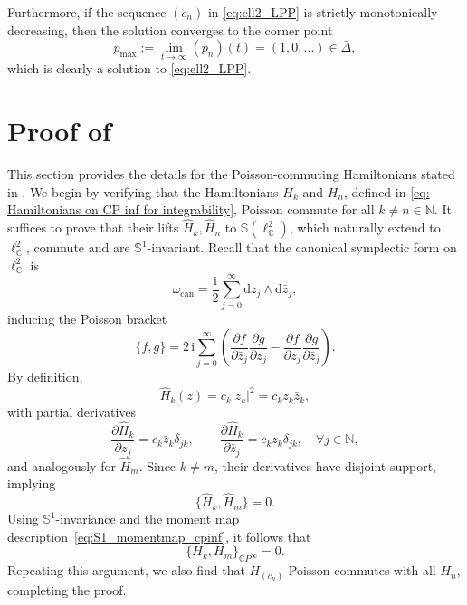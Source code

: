 \documentclass[runningheads]{llncs}
\def\i{\mathrm{i}}
\def\d{\mathrm{d}}
\begin{document}
Furthermore, if the sequence \( (c_n) \) in \eqref{eq:ell2_LPP} is strictly monotonically decreasing, then the solution converges to the corner point
\[
p_{\max} := \lim_{t \to \infty} (p_n)(t) = (1, 0, \dots) \in \bar{\Delta},
\]
which is clearly a solution to \eqref{eq:ell2_LPP}.
\section{Proof of }\label{Appendix proof of integrability of Hamiltonian system}
This section provides the details for the Poisson-commuting Hamiltonians stated in . We begin by verifying that the Hamiltonians \( H_k \) and \( H_n \), defined in \eqref{eq: Hamiltonians on CP inf for integrability}, Poisson commute for all \( k \neq n \in \mathbb{N} \). It suffices to prove that their lifts \( \hat{H}_k, \hat{H}_n \) to \( \mathbb{S}(\ell^2_{\mathbb{C}}) \), which naturally extend to \( \ell^2_{\mathbb{C}} \), commute and are \( \mathbb{S}^1 \)-invariant.
Recall that the canonical symplectic form on \( \ell^2_{\mathbb{C}} \) is
\[
\omega_{\mathrm{can}} = \frac{\i}{2} \sum_{j=0}^{\infty} \d z_j \wedge \d \bar{z}_j,
\]
inducing the Poisson bracket
\[
\{f, g\} = 2\,\i \sum_{j=0}^{\infty} \left( \frac{\partial f}{\partial \bar{z}_j} \frac{\partial g}{\partial z_j} - \frac{\partial f}{\partial z_j} \frac{\partial g}{\partial \bar{z}_j} \right).
\]
By definition,
\[
\hat{H}_k(z) = c_k |z_k|^2 = c_k z_k \bar{z}_k,
\]
with partial derivatives
\begin{equation*}\label{eq: appendix partial z of H}
    \frac{\partial \hat{H}_k}{\partial z_j} = c_k \bar{z}_k \delta_{jk}, \qquad
    \frac{\partial \hat{H}_k}{\partial \bar{z}_j} = c_k z_k \delta_{jk}, \quad \forall j \in \mathbb{N},
\end{equation*}
and analogously for \( \hat{H}_m \). Since \( k \neq m \), their derivatives have disjoint support, implying
\[
\{ \hat{H}_k, \hat{H}_m \} = 0.
\]
Using \( \mathbb{S}^1 \)-invariance and the moment map description~\eqref{eq:S1_momentmap_cpinf}, it follows that
\[
\{ H_k, H_m \}_{\mathbb{C}P^{\infty}} = 0.
\]
Repeating this argument, we also find that \( H_{(c_n)} \) Poisson-commutes with all \( H_n \), completing the proof.







\end{document}
